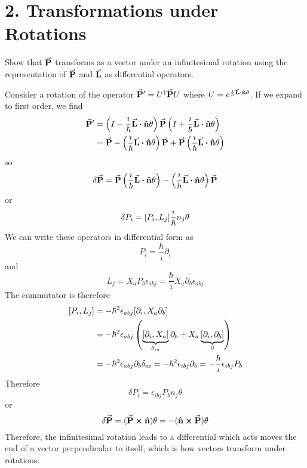\documentclass[a4paper,twoside]{article}
\begin{document}
\section*{2. Transformations under Rotations}
Show that $ \va{P} $ transforms as a vector under an infinitesimal rotation using the representation of $ \va{P} $ and $ \va{L} $ as differential operators.
\begin{problem}
    Consider a rotation of the operator $ \va{P}' = U^\dagger \va{P} U $ where $ U = e^{\frac{\imath}{\hbar} \va{L} \vdot \vu{n} \theta} $. If we expand to first order, we find
    \begin{align}
        \va{P}' &= \left( I - \frac{\imath}{\hbar} \va{L} \vdot \vu{n} \theta \right) \va{P} \left( I + \frac{\imath}{\hbar} \va{L} \vdot \vu{n} \theta \right) \\
        &= \va{P} - \left( \frac{\imath}{\hbar} \va{L} \vdot \vu{n} \theta \right) \va{P} + \va{P} \left( \frac{\imath}{\hbar} \va{L} \vdot \vu{n} \theta \right)
    \end{align}
    so
    \begin{equation}
        \delta \va{P} = \va{P} \left( \frac{\imath}{\hbar} \va{L} \vdot \vu{n} \theta \right) - \left( \frac{\imath}{\hbar} \va{L} \vdot \vu{n} \theta \right) \va{P}
    \end{equation}
    or
    \begin{equation}
        \delta P_i = \comm{P_i}{L_j} \frac{\imath}{\hbar} n_j \theta
    \end{equation}
    We can write these operators in differential form as
    \begin{equation}
        P_i = \frac{\hbar}{\imath} \partial_i
    \end{equation}
    and
    \begin{equation}
        L_j = X_a P_b \epsilon_{abj} = \frac{\hbar}{\imath} X_a \partial_b \epsilon_{abj}
    \end{equation}
    The commutator is therefore
    \begin{align}
        \comm{P_i}{L_j} &= - \hbar^2 \epsilon_{abj} \comm{\partial_i}{X_a \partial_b} \\
        &= - \hbar^2 \epsilon_{abj} \left( \underbrace{\comm{\partial_i}{X_a}}_{\delta_{ia}} \partial_b + X_a \underbrace{\comm{\partial_i}{\partial_b}}_{0} \right) \\
        &= - \hbar^2 \epsilon_{abj} \partial_b \delta_{ai} = - \hbar^2 \epsilon_{ibj} \partial_b = - \frac{\hbar}{\imath} \epsilon_{ibj} P_b
    \end{align}
    Therefore
    \begin{equation}
        \delta P_i = \epsilon_{ibj} P_b n_j \theta
    \end{equation}
    or
    \begin{equation}
        \delta \va{P} = (\va{P} \cross \vu{n}) \theta = - (\vu{n} \cross \va{P}) \theta
    \end{equation}
    Therefore, the infinitesimal rotation leads to a differential which acts moves the end of a vector perpendicular to itself, which is how vectors transform under rotations.
\end{problem}
\end{document}

